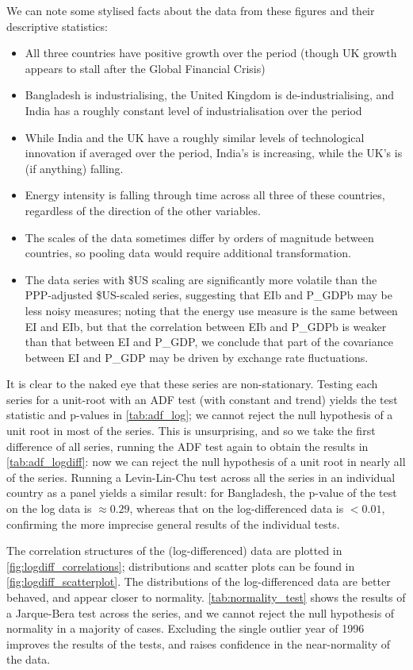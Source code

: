 \documentclass[11pt,a4paper]{article}
\begin{document}
We can note some stylised facts about the data from these figures and their descriptive statistics:
\begin{itemize}

\item All three countries have positive growth over the period (though UK growth appears to stall  after the Global Financial Crisis)
\item Bangladesh is industrialising, the United Kingdom is de-industrialising, and India has a roughly constant level of industrialisation over the period
\item While India and the UK have a roughly similar levels of technological innovation if averaged over the period, India's is increasing, while the UK's is (if anything) falling.
\item Energy intensity is falling through time across all three of these countries, regardless of the direction of the other variables.
\item The scales of the data sometimes differ by orders of magnitude between countries, so pooling data would require additional transformation.
\item The data series with \$US scaling are significantly more volatile than the PPP-adjusted \$US-scaled series, suggesting that EIb and P\_GDPb may be less noisy measures; noting that the energy use measure is the same between EI and EIb, but that the correlation between EIb and P\_GDPb is weaker than that between EI and P\_GDP, we conclude that part of the covariance between EI and P\_GDP may be driven by exchange rate fluctuations.
\end{itemize}
It is clear to the naked eye that these series are non-stationary.
Testing each series for a unit-root with an ADF test (with constant and trend) yields the test statistic and p-values in \cref{tab:adf_log}; we cannot reject the null hypothesis of a unit root in most of the series.
This is unsurprising, and so we take the first difference of all series, running the ADF test again to obtain the results in \cref{tab:adf_logdiff}: now we can reject the null hypothesis of a unit root in nearly all of the series.
Running a Levin-Lin-Chu test across all the series in an individual country as a panel yields a similar result: for Bangladesh, the p-value of the test on the log data is $\approx0.29$, whereas that on the log-differenced data is $<0.01$, confirming the more imprecise general results of the individual tests.

The correlation structures of the (log-differenced) data are plotted in \cref{fig:logdiff_correlations}; distributions and scatter plots can be found in \cref{fig:logdiff_scatterplot}.
The distributions of the log-differenced data are better behaved, and appear closer to normality.
\cref{tab:normality_test} shows the results of a Jarque-Bera test across the series, and we cannot reject the null hypothesis of normality in a majority of cases.
Excluding the single outlier year of 1996 improves the results of the tests, and raises confidence in the near-normality of the data.
\end{document}
